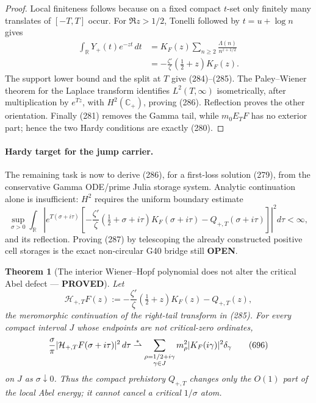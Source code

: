\documentclass[11pt]{article}
\newtheorem{theorem}{Theorem}
\newcommand{\PROVED}{\textcolor{green!45!black}{\textbf{PROVED}}}
\newcommand{\OPEN}{\textcolor{red!70!black}{\textbf{OPEN}}}
\begin{document}
\begin{proof}
Local finiteness follows because on a fixed compact $t$-set only finitely
many translates of $[-T,T]$ occur.  For $\Re z>1/2$, Tonelli followed by
$t=u+\log n$ gives
\begin{align*}
 \int_{\mathbb R}Y_+(t)e^{-zt}\,dt
 &=K_F(z)\sum_{n\ge2}\frac{\Lambda(n)}{n^{z+1/2}}\\
 &=-\frac{\zeta'}{\zeta}\left(\frac12+z\right)K_F(z).
\end{align*}
The support lower bound and the split at $T$ give (284)--(285).  The
Paley--Wiener theorem for the Laplace transform identifies
$L^2(T,\infty)$ isometrically, after multiplication by $e^{Tz}$, with
$H^2(\mathbb C_+)$, proving (286).  Reflection proves the other orientation.
Finally (281) removes the Gamma tail, while $m_0E_TF$ has no exterior part;
hence the two Hardy conditions are exactly (280).
\end{proof}

\paragraph{Hardy target for the jump carrier.}
The remaining task is now to derive (286), for a first-loss solution (279),
from the conservative Gamma ODE/prime Julia storage system.  Analytic
continuation alone is insufficient: $H^2$ requires the uniform boundary
estimate
\begin{equation}
 \sup_{\sigma>0}\int_{\mathbb R}
 \left|e^{T(\sigma+i\tau)}\left[
 -\frac{\zeta'}{\zeta}(\tfrac12+\sigma+i\tau)
 K_F(\sigma+i\tau)-Q_{+,T}(\sigma+i\tau)\right]
 \right|^2d\tau<\infty,                               \tag{287}
\end{equation}
and its reflection.  Proving (287) by telescoping the already constructed
positive cell storages is the exact non-circular G40 bridge still \OPEN{}.

\begin{theorem}[The interior Wiener--Hopf polynomial does not alter the
critical Abel defect --- \PROVED]
Let
\begin{equation}
 \mathcal H_{+,T}F(z):=
 -\frac{\zeta'}{\zeta}(\tfrac12+z)K_F(z)
 -Q_{+,T}(z),                                       \tag{695}
\end{equation}
the meromorphic continuation of the right-tail transform in (285).
For every compact interval \(J\) whose endpoints are not critical-zero
ordinates,
\begin{equation}
 \frac{\sigma}{\pi}
 |\mathcal H_{+,T}F(\sigma+i\tau)|^2\,d\tau
 \buildrel *\over\rightharpoonup
 \sum_{\substack{\rho=1/2+i\gamma\\\gamma\in J}}
 m_\rho^2|K_F(i\gamma)|^2\delta_\gamma             \tag{696}
\end{equation}
on \(J\) as \(\sigma\downarrow0\).  Thus the compact prehistory
\(Q_{+,T}\) changes only the \(O(1)\) part of the local Abel energy; it
cannot cancel a critical \(1/\sigma\) atom.
\end{theorem}
\end{document}
